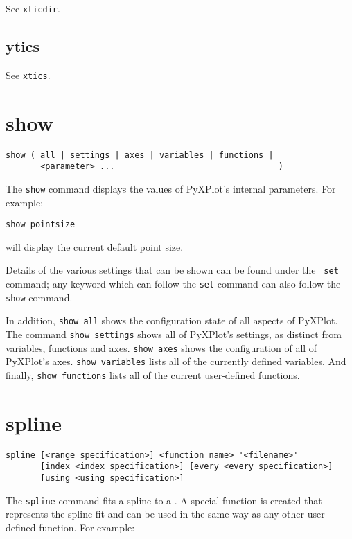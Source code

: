 See {\tt xticdir}.


\subsection{ytics}

See {\tt xtics}.

\section{show}

\begin{verbatim}
show ( all | settings | axes | variables | functions |
       <parameter> ...                                 )
\end{verbatim}

The {\tt show} command displays the values of PyXPlot's internal parameters. For
example:

\begin{verbatim}
show pointsize
\end{verbatim}

\noindent will display the current default point size.

Details of the various settings that can be shown can be found under the {\tt
set} command; any keyword which can follow the {\tt set} command can also follow
the {\tt show} command.

In addition, {\tt show all} shows the configuration state of all aspects of
PyXPlot. The command {\tt show settings} shows all of PyXPlot's settings, as
distinct from variables, functions and axes. {\tt show axes} shows the
configuration of all of PyXPlot's axes. {\tt show variables} lists all of the
currently defined variables. And finally, {\tt show functions} lists all of the
current user-defined functions.


\section{spline}

\begin{verbatim}
spline [<range specification>] <function name> '<filename>' 
       [index <index specification>] [every <every specification>]
       [using <using specification>]
\end{verbatim}

The {\tt spline} command fits a spline to a \datafile. A special function is
created that represents the spline fit and can be used in the same way as any
other user-defined function. For example:

